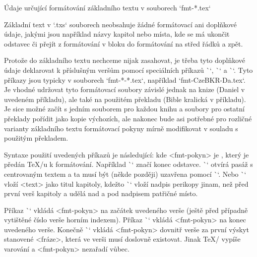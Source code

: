 \secc[fmt] Údaje určující formátování základního textu v souborech `fmt-*.tex`

Základní text v `.txs` souborech neobsahuje
žádné formátovací ani doplňkové údaje, jakými jsou například názvy kapitol
nebo místa, kde se má ukončit odstavec či přejít z formátování v bloku do
formátování na střed řádků a zpět.

Protože do základního textu nechceme nijak zasahovat, je třeba tyto doplňkové
údaje deklarovat k příslušným veršům pomocí speciálních příkazů \`\fmtadd`,
\`\fmtpre` a \`\fmtins`. Tyto příkazy jsou typicky v souborech `fmt-*-*.tex`,
například `fmt-CzeBKR-Da.tex`. Je vhodné udržovat tyto formátovací soubory
závislé jednak na knize (Daniel v uvedeném příkladu), ale také na použitém
překladu (Bible kralická v příkladu). Je sice možné začít s jedním souborem
pro každou knihu a soubory pro ostatní překlady pořídit jako kopie výchozích,
ale nakonec bude asi potřebné pro rozličné varianty základního textu
formátovací pokyny mírně modifikovat v souladu s použitým překladem.

Syntaxe použití uvedených příkazů je následující:
\begtt
{}
\endtt
kde <fmt-pokyn> je , který je předán \TeX/u k formátování.
Například \`\endgraf` značí konec odstavce. \`\begcenter` otvírá pasáž s
centrovaným textem a ta musí být (někde později) uzavřena pomocí \`\endcenter`. Nebo 
\`` vloží <text> jako titul kapitoly, kdežto
\`` vloží nadpis perikopy jinam, než před první verš kapitoly a udělá nad a pod nadpisem patřičné místo.

Příkaz \`\fmtpre` vkládá <fmt-pokyn>
na začátek uvedeného verše (ještě před případně vytištěné číslo verše horním
indexem). Příkaz \`\fmtadd` vkládá <fmt-pokyn> na konec uvedeného verše.
Konečně \`\fmtins` vkládá <fmt-pokyn> dovnitř verše za první výskyt stanovené
<fráze>, která ve verši musí doslovně existovat. Jinak \TeX/ vypíše varování
a <fmt-pokyn> nezařadí vůbec.

